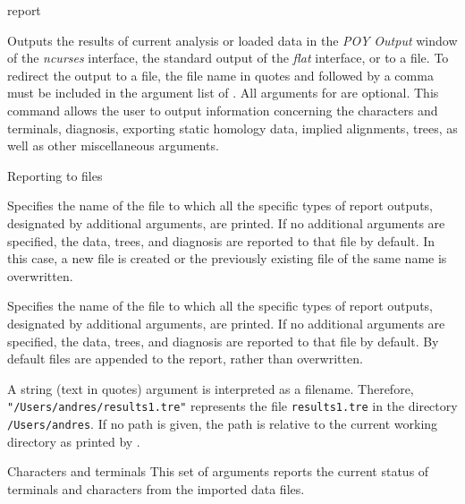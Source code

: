 
\begin{command}{report}{}


\begin{poydescription} 
Outputs the results of current analysis or loaded data in the \emph{POY Output}
window of the \emph{ncurses} interface, the standard output of the \emph{flat}
interface, or to a file. To redirect the output to a file, the file name in 
quotes and followed by a comma must be included in the argument list
of . All arguments for  are
optional. This command allows the user to output information concerning the 
characters and terminals, diagnosis, exporting static homology data, implied 
alignments, trees, as well as other miscellaneous arguments.
\end{poydescription}

\begin{arguments}

\begin{argumentgroup}{Reporting to files}{}

{Specifies the name of the file to which all the specific types of report outputs,
designated by additional arguments, are printed. If no additional arguments
are specified, the data, trees, and diagnosis are reported to that file by
default. In this case, a new file is created or the previously 
existing file of the same name is overwritten.} 
{}

{Specifies the name of the file to which all the specific types of report outputs,
designated by additional arguments, are printed. If no additional arguments
are specified, the data, trees, and diagnosis are reported to that file by
default. By default files are appended to the report, rather than overwritten.

A string (text in quotes) argument is interpreted as a filename.
Therefore, \texttt{"/Users/andres/results1.tre"} represents the file \texttt{results1.tre} in
the directory \texttt{/Users/andres}. If no path is given, the path
is relative to the current working directory as printed by .} 
{}


\end{argumentgroup}

\begin{argumentgroup}{Characters and terminals}
{This set of arguments reports the current status of terminals and
characters from the imported data files. }


\end{argumentgroup}
\end{arguments}
\end{command}
